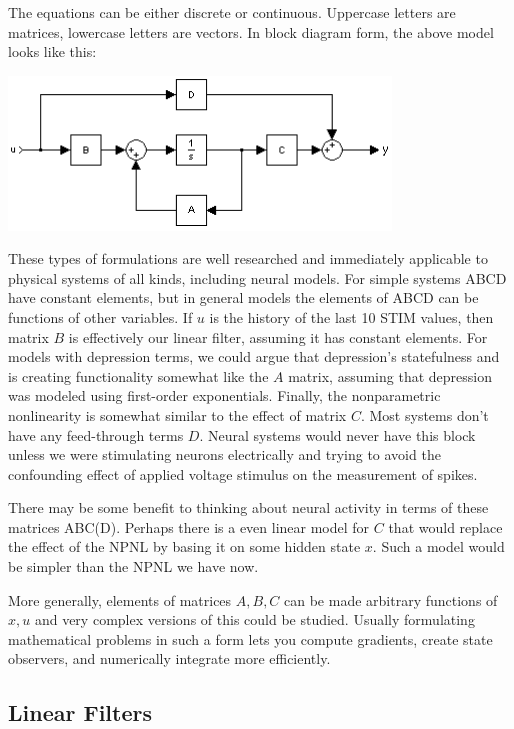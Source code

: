 \documentclass[11pt]{article}
\begin{document}
    The equations can be either discrete or continuous. Uppercase letters are matrices, lowercase letters are vectors. In block diagram form, the above model looks like this:

    \begin{center}\includegraphics[width=4in]{Typical_State_Space_model.png}\end{center}

    These types of formulations are well researched and immediately applicable to physical systems of all kinds, including neural models. For simple systems ABCD have constant elements, but in general models the elements of ABCD can be functions of other variables. If $u$ is the history of the last 10 STIM values, then matrix $B$ is effectively our linear filter, assuming it has constant elements. For models with depression terms, we could argue that depression's statefulness and is creating functionality somewhat like the $A$ matrix, assuming that depression was modeled using first-order exponentials. Finally, the nonparametric nonlinearity is somewhat similar to the effect of matrix $C$. Most systems don't have any feed-through terms $D$. Neural systems would never have this block unless we were stimulating neurons electrically and trying to avoid the confounding effect of applied voltage stimulus on the measurement of spikes. 

    There may be some benefit to thinking about neural activity in terms of these matrices ABC(D). Perhaps there is a even linear model for $C$ that would replace the effect of the NPNL by basing it on some hidden state $x$. Such a model would be simpler than the NPNL we have now. 

    More generally, elements of matrices $A,B,C$ can be made arbitrary functions of $x,u$ and very complex versions of this could be studied. Usually formulating mathematical problems in such a form lets you compute gradients, create state observers, and numerically integrate more efficiently.

\subsection{Linear Filters}
\label{sec-2.5}
\end{document}
